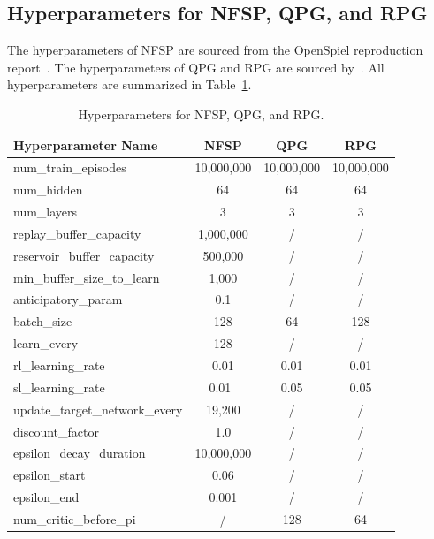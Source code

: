 \documentclass[letterpaper]{article} %
\begin{document}
\subsection{Hyperparameters for NFSP, QPG, and RPG}

The hyperparameters of NFSP are sourced from the OpenSpiel reproduction report~\cite{walton2021multi}. The hyperparameters of QPG and RPG are sourced by~\cite{farina2021model}. All hyperparameters are summarized in Table~\ref{tab:nfsp}.

\begin{table}[h]
	\centering
    \begin{tabular}{lccc}
        \toprule
        \textbf{Hyperparameter Name}     & \textbf{NFSP} & \textbf{QPG} & \textbf{RPG}\\ \midrule
        
        num\_train\_episodes& 10,000,000& 10,000,000 & 10,000,000 \\
        num\_hidden& 64 & 64 & 64\\
        num\_layers& 3 & 3 & 3\\
        replay\_buffer\_capacity& 1,000,000 & / & /\\
        reservoir\_buffer\_capacity& 500,000& / & /\\
        min\_buffer\_size\_to\_learn& 1,000& / & /\\
        anticipatory\_param& 0.1& / & /\\
        batch\_size& 128& 64 & 128\\
        learn\_every& 128& / & /\\
        rl\_learning\_rate& 0.01 & 0.01 & 0.01\\
        sl\_learning\_rate& 0.01\ & 0.05 & 0.05\\
        update\_target\_network\_every& 19,200& / & /\\
        discount\_factor& 1.0& / & /\\
        epsilon\_decay\_duration& 10,000,000& / & /\\
        epsilon\_start& 0.06& / & /\\
        epsilon\_end& 0.001& / & /\\
        num\_critic\_before\_pi&/& 128 & 64\\
        \bottomrule

	\end{tabular}
    \caption{Hyperparameters for NFSP, QPG, and RPG.}
    \label{tab:nfsp}
\end{table}
\end{document}
